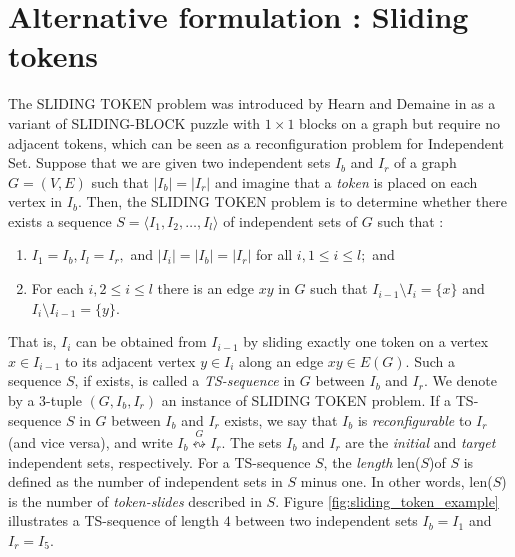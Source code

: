 \section{Alternative formulation : Sliding tokens} \label{sec:sliding_tokens}
The SLIDING TOKEN problem was introduced by Hearn and Demaine in \cite{hearn_pspace-completeness_2004} as a variant of SLIDING-BLOCK puzzle
with $1 \times 1 $ blocks on a graph but require no adjacent tokens, which can be seen as a reconfiguration problem for Independent Set.
Suppose that we are given two independent sets $I_b$ and $I_r$ of a graph $G =(V,E)$ such that $|I_b| = |I_r|$ and imagine that a
\textit{token} is placed on each vertex in $I_b$. Then, the SLIDING TOKEN problem is to determine whether there exists a sequence
$ S = \langle I_1, I_2, \dots, I_l \rangle$ of independent sets of $G$ such that :
\begin{enumerate}
  \item $I_1 = I_b, I_l = I_r,$ and $|I_i| = |I_b| = |I_r|$ for all $i, 1 \leq i \leq l;$ and
  \item For each $i, 2 \leq i \leq l$ there is an edge $xy$ in $G$ such that  $I_{i-1} \setminus I_{i} = \{x\}$ and $I_{i} \setminus I_{i-1} = \{y\}$.
\end{enumerate}
That is, $I_i$ can be obtained from $I_{i-1}$ by sliding exactly one token on a vertex $x \in I_{i-1}$ to its adjacent vertex $y \in I_{i}$
along an edge $xy \in E(G)$. Such a sequence $S$, if exists, is called a \textit{TS-sequence} in $G$ between $I_b$ and $I_r$.
We denote by a $3$-tuple $(G, I_{b}, I_{r})$ an instance of SLIDING TOKEN problem.  If a TS-sequence $S$ in $G$ between $I_{b}$ and $I_{r}$ exists,
we say that $I_{b}$ is \textit{reconfigurable} to $I_{r}$ (and vice versa), and write $I_{b} \overset{G}\leftrightsquigarrow I_{r}$. The sets
$I_{b}$ and $I_{r}$ are the \textit{initial} and \textit{target} independent sets, respectively. For a TS-sequence $S$, the \textit{length}
len($S$)of $S$ is defined as the number of independent sets in $S$ minus one. In other words, len($S$) is the number of \textit{token-slides}
described in $S$. Figure \ref{fig:sliding_token_example} illustrates a TS-sequence of length $4$ between two independent sets
$I_{b} = I_{1}$ and $I_{r} = I_{5}$.

